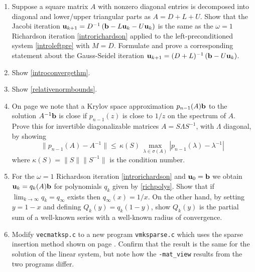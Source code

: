 \renewcommand{\labelenumi}{\arabic{chapter}.\arabic{enumi}\quad}
\begin{enumerate}
\item \label{exer:ls:jacobirichardson}  Suppose a square matrix $A$ with nonzero diagonal entries is decomposed into diagonal and lower/upper triangular parts as $A=D+L+U$.  Show that the Jacobi iteration $\mathbf{u}_{k+1} = D^{-1} \left(\mathbf{b} - L \mathbf{u}_k - U \mathbf{u}_k\right)$ is the same as the $\omega=1$ Richardson iteration \eqref{introrichardson} applied to the left-preconditioned system \eqref{introleftpre} with $M=D$.  Formulate and prove a corresponding statement about the Gauss-Seidel iteration $\mathbf{u}_{k+1} = (D+L)^{-1} \left(\mathbf{b} - U \mathbf{u}_k\right)$.
\item \label{exer:ls:showconvergethm}  Show \eqref{introconvergethm}.

\item \label{exer:ls:errornorms}  Show \eqref{relativenormbounds}.

\item On page \pageref{eq:ls:krylovgoal} we note that a Krylov space approximation $p_{n-1}(A)\mathbf{b}$ to the solution $A^{-1}\mathbf{b}$ is close if $p_{n-1}(z)$ is close to $1/z$ on the spectrum of $A$.  Prove this for invertible diagonalizable matrices $A=S\Lambda S^{-1}$, with $\Lambda$ diagonal, by showing
	$$\|p_{n-1}(A) - A^{-1}\| \le \,\kappa(S)\, \max_{\lambda \in \sigma(A)} |p_{n-1}(\lambda) - \lambda^{-1}|$$
where $\kappa(S) = \|S\| \|S^{-1}\|$ is the condition number.

\item For the $\omega=1$ Richardson iteration \eqref{introrichardson} and $\mathbf{u}_0=\mathbf{b}$ we obtain $\mathbf{u}_k = q_k(A) \mathbf{b}$ for polynomials $q_k$ given by \eqref{richpolys}.  Show that if $\lim_{k\to\infty} q_k=q_\infty$ exists then $q_\infty(x)=1/x$.  On the other hand, by setting $y=1-x$ and defining $Q_k(y)=q_k(1-y)$, show $Q_k(y)$ is the partial sum of a well-known series with a well-known radius of convergence.

\item \label{exer:ls:sparseinsertion}  Modify \texttt{vecmatksp.c} to a new program \texttt{vmksparse.c} which uses the sparse insertion method shown on page \pageref{page:ls:sparseinsertion}.  Confirm that the result is the same for the solution of the linear system, but note how the \texttt{-mat\_view} results from the two programs differ.


\end{enumerate}
